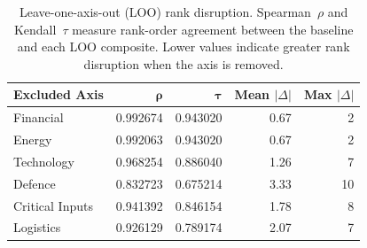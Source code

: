\begin{table}[htbp]
\centering
\caption{Leave-one-axis-out (LOO) rank disruption.  Spearman~$\rho$ and Kendall~$\tau$ measure rank-order agreement between the baseline and each LOO composite.  Lower values indicate greater rank disruption when the axis is removed.}
\label{tab:loo-disruption}
\begin{tabular}{@{}l rrrr@{}}
\toprule
\textbf{Excluded Axis} & $\boldsymbol{\rho}$ & $\boldsymbol{\tau}$ & \textbf{Mean} $|\Delta|$ & \textbf{Max} $|\Delta|$ \\
\midrule
  Financial & 0.992674 & 0.943020 & 0.67 & 2 \\
  Energy & 0.992063 & 0.943020 & 0.67 & 2 \\
  Technology & 0.968254 & 0.886040 & 1.26 & 7 \\
  Defence & 0.832723 & 0.675214 & 3.33 & 10 \\
  Critical Inputs & 0.941392 & 0.846154 & 1.78 & 8 \\
  Logistics & 0.926129 & 0.789174 & 2.07 & 7 \\
\bottomrule
\end{tabular}
\end{table}